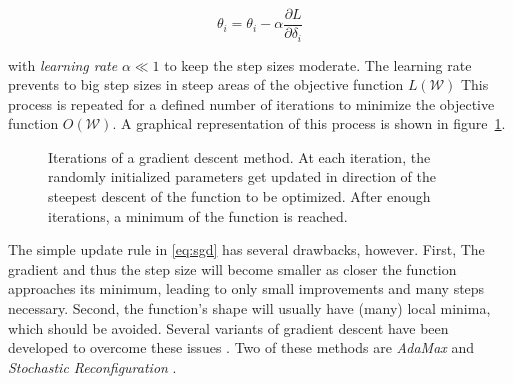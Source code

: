 \begin{equation}
    \label{eq:sgd}
    \theta_i = \theta_i - \alpha \frac{\partial L}{\partial \delta_i}
\end{equation}

with \textit{learning rate} $\alpha \ll 1$ to keep the step sizes moderate. The learning rate prevents to big step sizes in steep 
areas of the objective function $L(\mathcal{W})$
This process is repeated for a defined number of iterations to minimize the objective function $O(\mathcal{W})$.
A graphical representation of this process is shown in figure~\ref{fig:sgd}.

\begin{figure}[H]
    \centering
    

    \caption[Gradient Descent]{Iterations of a gradient descent method. At each iteration, the randomly initialized parameters get updated in 
    direction of the steepest descent of the function to be optimized. After enough iterations, a minimum of the function is reached.}
    \label{fig:sgd}
\end{figure}

The simple update rule in \ref{eq:sgd} has several drawbacks, however. First, The gradient and thus the step size will become smaller as closer the function approaches its minimum, leading to only small improvements and many steps necessary.
Second, the function's shape will usually have (many) local minima, which should be avoided.
Several variants of gradient descent have been developed to overcome these issues \cite{ruder2016overview}.
Two of these methods are \textit{AdaMax} \cite{ruder2016overview} and \textit{Stochastic Reconfiguration} \cite{sorella1998green}.

